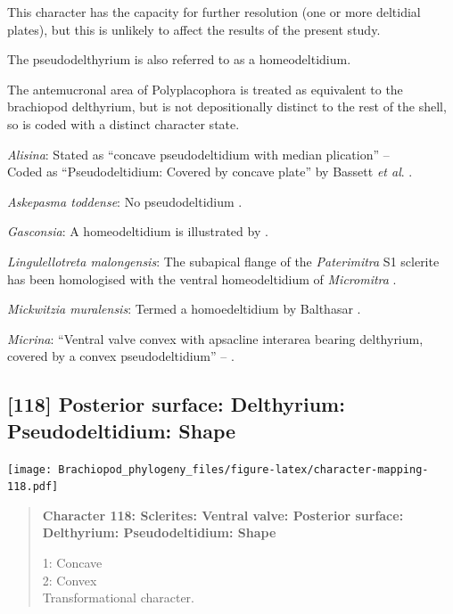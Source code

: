 \documentclass[openany]{book}
\begin{document}
This character has the capacity for further resolution (one or more
deltidial plates), but this is unlikely to affect the results of the
present study.

The pseudodelthyrium is also referred to as a homeodeltidium.

The antemucronal area of Polyplacophora is treated as equivalent to the
brachiopod delthyrium, but is not depositionally distinct to the rest of
the shell, so is coded with a distinct character state.

\hypertarget{Alisina-coding-117}{}
\emph{Alisina}: Stated as ``concave pseudodeltidium with median
plication'' -- \citet{Williams2000LinguliformeaCraniiformea}\\
Coded as ``Pseudodeltidium: Covered by concave plate'' by Bassett
\emph{et al}. \citeyearpar{Bassett2001Functionalmorphology}.

\hypertarget{Askepasma_toddense-coding-117}{}
\emph{Askepasma toddense}: No pseudodeltidium
\citep[p.~153]{Williams2000LinguliformeaCraniiformea}.

\hypertarget{Gasconsia-coding-117}{}
\emph{Gasconsia}: A homeodeltidium is illustrated by
\citet{Hanken1985Thetaxonomy}.

\hypertarget{Lingulellotreta_malongensis-coding-117}{}
\emph{Lingulellotreta malongensis}: The subapical flange of the
\emph{Paterimitra} S1 sclerite has been homologised with the ventral
homeodeltidium of \emph{Micromitra} \citep{Larsson2014iPaterimitra}.

\hypertarget{Mickwitzia_muralensis-coding-117}{}
\emph{Mickwitzia muralensis}: Termed a homoedeltidium by Balthasar
\citeyearpar{Balthasar2004Shellstructure}.

\hypertarget{Micrina-coding-117}{}
\emph{Micrina}: ``Ventral valve convex with apsacline interarea bearing
delthyrium, covered by a convex pseudodeltidium'' --
\citet{Holmer2008TheEarly}.

\subsection*{{[}118{]} Posterior surface: Delthyrium: Pseudodeltidium:
Shape}\label{posterior-surface-delthyrium-pseudodeltidium-shape}

\texttt{[image: Brachiopod\_phylogeny\_files/figure-latex/character-mapping-118.pdf]}

\begin{quote}
\textbf{Character 118: Sclerites: Ventral valve: Posterior surface:
Delthyrium: Pseudodeltidium: Shape}

1: Concave\\
2: Convex\\
Transformational character.
\end{quote}
\end{document}
